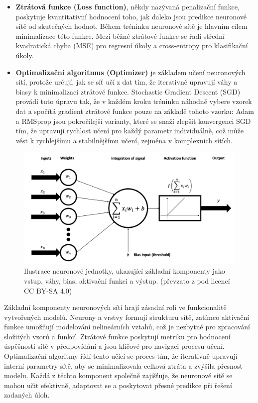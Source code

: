\documentclass[male,czech,api_ing]{thesis}
\begin{document}
\begin{itemize}
    \item \textbf{Ztrátová funkce (Loss function)}, někdy nazývaná penalizační funkce, poskytuje kvantitativní hodnocení toho, jak daleko jsou predikce neuronové sítě od skutečných hodnot. Během tréninku neuronové sítě je hlavním cílem minimalizace této funkce. Mezi běžné ztrátové funkce se řadí střední kvadratická chyba (MSE) pro regresní úkoly a cross-entropy pro klasifikační úkoly. 
    \item \textbf{Optimalizační algoritmus (Optimizer)} je základem učení neuronových sítí, protože určují, jak se síť učí z dat tím, že iterativně upravují váhy a biasy k minimalizaci ztrátové funkce. Stochastic Gradient Descent (SGD) provádí tuto úpravu tak, že v každém kroku tréninku náhodně vybere vzorek dat a spočítá gradient ztrátové funkce pouze na základě tohoto vzorku:
    Adam a RMSprop jsou pokročilejší varianty, které se snaží zlepšit konvergenci SGD tím, že upravují rychlost učení pro každý parametr individuálně, což může vést k rychlejšímu a stabilnějšímu učení, zejména v komplexních sítích.
\end{itemize}

\begin{figure}[h]
    \centering
    \includegraphics[width=\linewidth]{Prilohy/Obrazky/NNComponents.png}
    \caption{Ilustrace neuronové jednotky, ukazující základní komponenty jako vstup, váhy, bias, aktivační funkci a výstup. (převzato z \cite{NNComponentsIMG} pod licencí CC BY-SA 4.0)}
    \label{fig:nn_components}
\end{figure}

Základní komponenty neuronových sítí hrají zásadní roli ve funkcionalitě vytvořených modelů. Neurony a vrstvy formují strukturu sítě, zatímco aktivační funkce umožňují modelování nelineárních vztahů, což je nezbytné pro zpracování složitých vzorů a funkcí. Ztrátové funkce poskytují metriku pro hodnocení úspěšnosti sítě v předpovídání a jsou klíčové pro navigaci procesu učení. Optimalizační algoritmy řídí tento učící se proces tím, že iterativně upravují interní parametry sítě, aby se minimalizovala celková ztráta a zvýšila přesnost modelu. Každá z těchto komponent společně zajišťuje, že neuronové sítě se mohou učit efektivně, adaptovat se a poskytovat přesné predikce při řešení zadaných úloh. \cite{CNNConcepts, CNNConcepts2}
\end{document}
